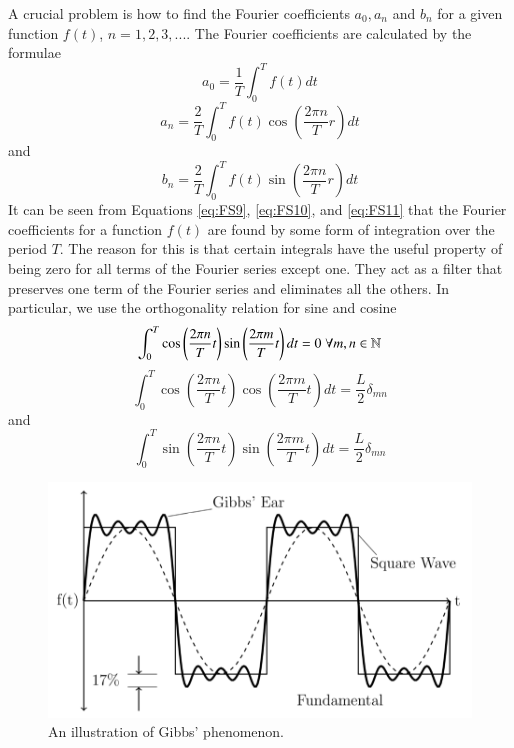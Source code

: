 \noindent A crucial problem is how to find the Fourier coefficients $a_0, a_n$ and $b_n$ for a given function $f(t)$, $n = 1,2,3,...$. The Fourier coefficients are calculated by the formulae \begin{equation}\label{eq:FS9}
    a_0 = \frac{1}{T}\int_0^Tf(t)dt
\end{equation}
\begin{equation}\label{eq:FS10}
    a_n = \frac{2}{T}\int_0^Tf(t)\cos\left(\frac{2\pi n}{T}r\right)dt 
\end{equation}
and \begin{equation}\label{eq:FS11}
    b_n = \frac{2}{T}\int_0^Tf(t)\sin\left(\frac{2\pi n}{T}r\right)dt 
\end{equation}
It can be seen from Equations \ref{eq:FS9}, \ref{eq:FS10}, and \ref{eq:FS11} that the Fourier coefficients for a function $f(t)$ are found by some form of integration over the period $T$. The reason for this is that certain integrals have the useful property of being zero for all terms of the Fourier series except one. They act as a filter that preserves one term of the Fourier series and eliminates all the others. In particular, we use the orthogonality relation for sine and cosine\begin{equation}\label{eq:FS12}
    \int_0^T\cos\left(\frac{2\pi n}{T}t\right)\sin\left(\frac{2\pi m}{T}t\right)dt = 0 \;\forall m,n \in \mathbb N
\end{equation}
\begin{equation}\label{eq:FS13}
    \int_0^T\cos\left(\frac{2\pi n}{T}t\right)\cos\left(\frac{2\pi m}{T}t\right)dt = \frac{L}{2}\delta_{mn}
\end{equation}
and \begin{equation}\label{eq:FS14}
    \int_0^T\sin\left(\frac{2\pi n}{T}t\right)\sin\left(\frac{2\pi m}{T}t\right)dt = \frac{L}{2}\delta_{mn}
\end{equation}


\begin{figure}[H]
    \centering
    \includegraphics[scale = 0.8]{Images/FS4.PNG}
    \caption{An illustration of Gibbs' phenomenon.}
    \label{fig:FS4}
\end{figure}

